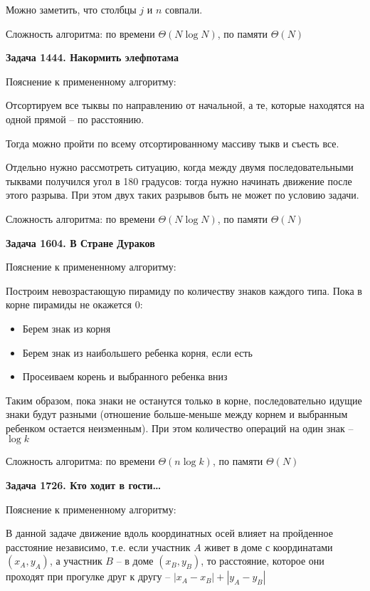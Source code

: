 \documentclass[12pt,a4paper]{article}
\begin{document}
    Можно заметить, что столбцы $j$ и $n$ совпали.


    Сложность алгоритма: по времени $\Theta(N\log N)$, по памяти $\Theta(N)$

    \bigskip

    \textbf{Задача 1444. Накормить элефпотама}

    Пояснение к примененному алгоритму:

    Отсортируем все тыквы по направлению от начальной, а те, которые находятся на одной прямой -- по расстоянию.

    Тогда можно пройти по всему отсортированному массиву тыкв и съесть все.

    Отдельно нужно рассмотреть ситуацию, когда между двумя последовательными тыквами получился угол в 180 градусов:
    тогда нужно начинать движение после этого разрыва.
    При этом двух таких разрывов быть не может по условию задачи.

    Сложность алгоритма: по времени $\Theta(N\log N)$, по памяти $\Theta(N)$

    \bigskip

    \textbf{Задача 1604. В Стране Дураков}

    Пояснение к примененному алгоритму:

    Построим невозрастающую пирамиду по количеству знаков каждого типа.
    Пока в корне пирамиды не окажется 0:
    \begin{itemize}
        \item Берем знак из корня
        \item Берем знак из наибольшего ребенка корня, если есть
        \item Просеиваем корень и выбранного ребенка вниз
    \end{itemize}
    Таким образом, пока знаки не останутся только в корне,
    последовательно идущие знаки будут разными
    (отношение больше-меньше между корнем и выбранным ребенком остается неизменным).
    При этом количество операций на один знак -- $\log k$

    Сложность алгоритма: по времени $\Theta(n\log k)$, по памяти $\Theta(N)$

    \bigskip

    \textbf{Задача 1726. Кто ходит в гости\ldots}

    Пояснение к примененному алгоритму:

    В данной задаче движение вдоль координатных осей влияет на пройденное расстояние независимо,
    т.е. если участник $A$ живет в доме с координатами $(x_A,y_A)$, а участник $B$ -- в доме $(x_B,y_B)$,
    то расстояние, которое они проходят при прогулке друг к другу -- $|x_A-x_B|+|y_A-y_B|$
\end{document}
